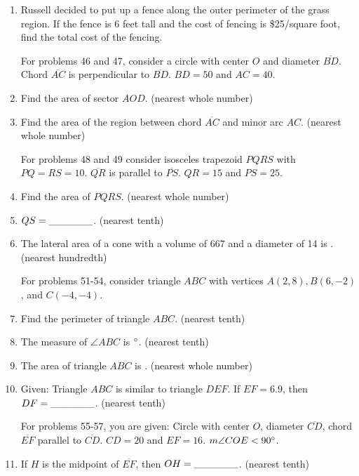 \documentclass[../uilmath.tex]{subfiles}
\begin{document}
\begin{enumerate}[label=\bfseries\arabic*.]
    \item %
    Russell decided to put up a fence along the outer perimeter of the grass region. If the fence is 
    6 feet tall and the cost of fencing is \$25/square foot, find the total cost of the fencing.

    For problems 46 and 47, consider a circle with center $O$ and diameter $\overline{BD}$. Chord $\overline{AC}$ is perpendicular to $\overline{BD}$.
    $BD=50$ and $AC=40$.
    \item %
    Find the area of sector $AOD$. (nearest whole number)

    \item %
    Find the area of the region between chord $\overline{AC}$ and minor arc $AC$. (nearest whole number)


    For problems 48 and 49 consider isosceles trapezoid $PQRS$ with $PQ=RS=10$. $\overline{QR}$ is parallel to $\overline{PS}$. 
    $QR=15$ and $PS=25$.
    \item %
    Find the area of $PQRS$. (nearest whole number)

    \item %
    $QS=\_\_\_\_\_\_$. (nearest tenth)

    \item %
    The lateral area of a cone with a volume of 667 and a diameter of 14 is \blank. (nearest hundredth)


    For problems 51-54, consider triangle $ABC$ with vertices $A(2,8), B(6,-2)$, and $C(-4,-4)$.
    \item %
    Find the perimeter of triangle $ABC$. (nearest tenth)

    \item %
    The measure of $\angle ABC$ is \blank $\degree$. (nearest tenth)

    \item %
    The area of triangle $ABC$ is \blank. (nearest whole number)

    \item %
    Given: Triangle $ABC$ is similar to triangle $DEF$. If $EF=6.9$, then $DF=\_\_\_\_\_\_$. (nearest tenth)


    For problems 55-57, you are given: Circle with center $O$, diameter $\overline{CD}$, chord $\overline{EF}$ parallel to $\overline{CD}$. $CD=20$ and $EF=16$. $m\angle COE<90\degree$.
    \item %
    If $H$ is the midpoint of $\overline{EF}$, then $OH=\_\_\_\_\_\_$. (nearest tenth)


\end{enumerate}
\end{document}
